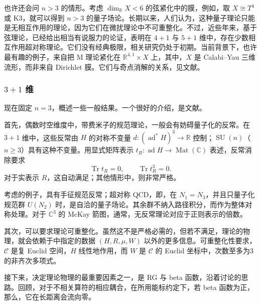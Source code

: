 也许还会问 $n>3$ 的情形。考虑 $\dim_{\mathbb R}X<6$ 的弦紧化中的膜，例如，取 $X\cong T^4$ 或 K3，就可以得到 $n>3$ 的量子场论。长期以来，人们认为，这种量子理论只能是无相互作用的理论，因为它们在微扰理论中不可重整化。不过，近些年来，基于弦理论，已经给出相当有说服力的论证，表明在 $4+1$ 与 $5+1$ 维中，存在少数相互作用超对称理论。它们没有经典极限，相关研究仍处于初期。当前背景下，也许最有趣的例子，来自把 M 理论紧化在 $\mathbb{R}^{4,1}\times X$ 上，其中，$X$ 是 Calabi--Yau 三维流形，而非来自 Dirichlet 膜。它们与奇点消解的关系，见文献。

\subsubsection{\texorpdfstring{$3+1$}{3+1} 维}\label{sec:5.4.6.2}

现在固定 $n=3$，概述一些一般结果。一个很好的介绍，是文献。

首先，偶数时空维度中，带费米子的规范理论，一般会有妨碍量子化的反常。在 $3+1$ 维中，这些反常由 $H$ 的对称不变量 $d\colon(\operatorname{ad}^*H)^3\to\mathbb{R}$ 控制；$\operatorname{SU}(n)$（$n\ge3$）具有这种不变量。用显式矩阵表示 $t_R\colon\operatorname{ad}H\to\operatorname{Mat}(\mathbb{C})$ 表述，反常消除要求
\[
\operatorname{Tr}t_R=0,\qquad\operatorname{Tr}t_R^3=0.
\]
对于实表示 $R$，这自动满足；其他情形中，则非常严格。

考虑的例子，具有手征规范反常；超对称 QCD，即，在 $N_1=N_3$，并且只量子化规范群 $U(N_2)$ 时，是自洽的量子场论。其余群不纳入路径积分，而作为整体对称处理。对于 $\mathbb{C}^3$ 的 McKay 箭图，通常，无反常理论对应于正则表示的倍数。

其次，可以要求理论可重整化。虽然这不是严格必需的，但若不满足，理论的物理，就会依赖于中指定的数据 $(H,R,\mu,W)$ 以外的更多信息。可重整化性要求，$\mathcal{C}$ 是复 Euclid 空间，$H$ 线性地作用，而 $W$ 是 $\mathcal{C}$ 的 Euclid 坐标中，次数至多为3的非齐次多项式。

接下来，决定理论物理的最重要因素之一，是 RG 与 beta 函数，沿着讨论的思路。回顾，对于不相关算符的相应耦合，在所用能标约定下，若 beta 函数为正，那么，它在长距离会流向零。

